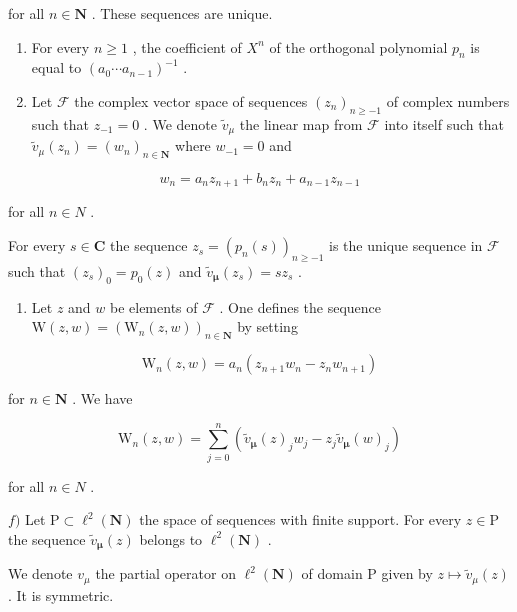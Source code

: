 for all \(n \in \mathbf{N}\) . These sequences are unique.

\begin{enumerate}
\def\labelenumi{\alph{enumi})}
\setcounter{enumi}{2}
\item
  For every \(n \geqslant 1\) , the coefficient of \(X^{n}\) of the orthogonal polynomial \(p_{n}\) is equal to \((a_{0} \cdots a_{n-1})^{-1}\) .
\item
  Let \(\mathcal{F}\) the complex vector space of sequences \((z_{n})_{n\geqslant -1}\) of complex numbers such that \(z_{-1} = 0\) . We denote \(\widetilde{v}_{\mu}\) the linear map from \(\mathcal{F}\) into itself such that \(\widetilde{v}_{\mu}(z_n) = (w_n)_{n\in \mathbf{N}}\) where \(w_{-1} = 0\) and
\end{enumerate}

\[
w _ {n} = a _ {n} z _ {n + 1} + b _ {n} z _ {n} + a _ {n - 1} z _ {n - 1}
\]

for all \(n \in N\) .

For every \(s \in \mathbf{C}\) the sequence \(z_s = (p_n(s))_{n \geqslant -1}\) is the unique sequence in \(\mathcal{F}\) such that \((z_s)_0 = p_0(z)\) and \(\widetilde{v}_{\boldsymbol{\mu}}(z_s) = sz_s\) .

\begin{enumerate}
\def\labelenumi{\alph{enumi})}
\setcounter{enumi}{4}
\tightlist
\item
  Let \(z\) and \(w\) be elements of \(\mathcal{F}\) . One defines the sequence \(\mathrm{W}(z,w) = (\mathrm{W}_n(z,w))_{n\in \mathbf{N}}\) by setting
\end{enumerate}

\[
\mathrm{W} _ {n} (z, w) = a _ {n} (z _ {n + 1} w _ {n} - z _ {n} w _ {n + 1})
\]

for \(n\in \mathbf{N}\) . We have

\[
\mathrm{W} _ {n} (z, w) = \sum_ {j = 0} ^ {n} (\widetilde {v} _ {\boldsymbol {\mu}} (z) _ {j} w _ {j} - z _ {j} \widetilde {v} _ {\boldsymbol {\mu}} (w) _ {j})
\]

for all \(n \in N\) .

\(f)\) Let \(\mathrm{P} \subset \ell^2(\mathbf{N})\) the space of sequences with finite support. For every \(z \in \mathrm{P}\) the sequence \(\widetilde{v}_{\boldsymbol{\mu}}(z)\) belongs to \(\ell^2(\mathbf{N})\) .

We denote \(v_{\mu}\) the partial operator on \(\ell^2(\mathbf{N})\) of domain P given by \(z \mapsto \widetilde{v}_{\mu}(z)\) . It is symmetric.

